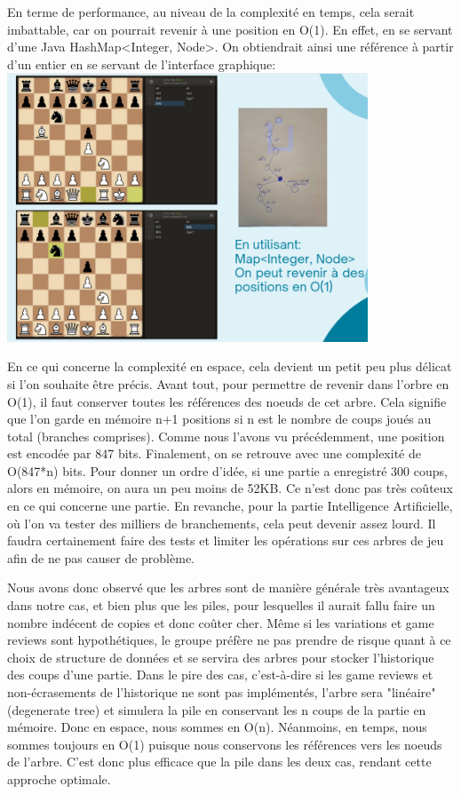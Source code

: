 \documentclass{article}
\begin{document}
En terme de performance, au niveau de la complexité en temps, cela serait imbattable, car on pourrait revenir à une position en O(1). En effet,
en se servant d'une Java HashMap\textless Integer, Node\textgreater. On obtiendrait ainsi une référence à partir d'un entier en se servant de
l'interface graphique:\\
\includegraphics[height=8.0cm]{arbres-reprise-coups.png}

En ce qui concerne la complexité en espace, cela devient un petit peu plus délicat si l'on souhaite être précis. Avant tout, pour permettre de
revenir dans l'orbre en O(1), il faut conserver toutes les références des noeuds de cet arbre. Cela signifie que l'on garde en mémoire n+1 positions 
si n est le nombre de coups joués au total (branches comprises). Comme nous l'avons vu précédemment, une position est encodée par 847 bits.
Finalement, on se retrouve avec une complexité de O(847*n) bits. Pour donner un ordre d'idée, si une partie a enregistré 300 coups, alors en mémoire,
on aura un peu moins de 52KB. Ce n'est donc pas très coûteux en ce qui concerne une partie. En revanche, pour la partie Intelligence Artificielle,
où l'on va tester des milliers de branchements, cela peut devenir assez lourd. Il faudra certainement faire des tests et limiter les opérations
sur ces arbres de jeu afin de ne pas causer de problème.

\par Nous avons donc observé que les arbres sont de manière générale très avantageux dans notre cas, et bien plus que les piles, pour lesquelles
il aurait fallu faire un nombre indécent de copies et donc coûter cher. Même si les variations et game reviews sont hypothétiques, le groupe préfère
ne pas prendre de risque quant à ce choix de structure de données et se servira des arbres pour stocker l'historique des coups d'une partie.
Dans le pire des cas, c'est-à-dire si les game reviews et non-écrasements de l'historique ne sont pas implémentés, l'arbre sera "linéaire"
(degenerate tree) et simulera la pile en conservant les n coups de la partie en mémoire. Donc en espace, nous sommes en O(n).
Néanmoins, en temps, nous sommes toujours en O(1) puisque nous conservons les références vers les noeuds de l'arbre. C'est donc plus efficace que
la pile dans les deux cas, rendant cette approche optimale.
\end{document}

